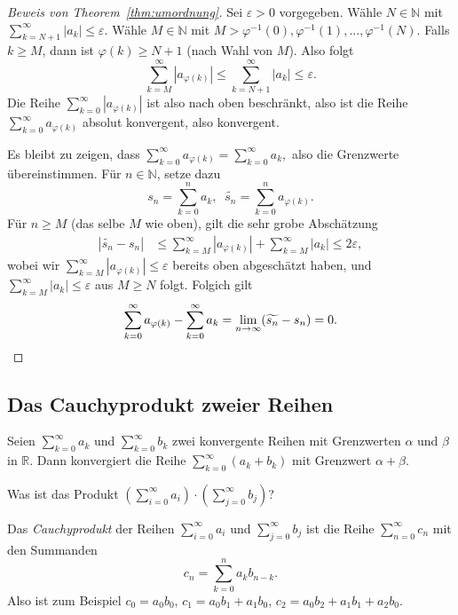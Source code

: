 \documentclass[../main.tex]{subfiles}
\begin{document}
\begin{proof}[Beweis von Theorem~\ref{thm:umordnung}]
  Sei $\varepsilon > 0$ 
  vorgegeben.
  Wähle $N \in \mathbb{N}$ 
  mit $\sum_{k=N+1}^{\infty} |a_k| \leq \varepsilon$.
  Wähle $M \in \mathbb{N}$ mit $M > \varphi^{-1}(0),
  \varphi^{-1}(1), \dots, \varphi^{-1}(N)$.
  Falls $k \geq M$, dann ist $\varphi(k) \geq N+1$
  (nach Wahl von $M$).
  Also folgt
  \[
   \sum_{k=M}^{\infty} |a_{\varphi(k)}| 
   \leq \sum_{k=N+1}^{\infty} |a_k| \leq \varepsilon.
  \]
  Die Reihe
  $\sum_{k=0}^{\infty} |a_{\varphi(k)}|$ ist also
  nach oben beschränkt,
  also ist die Reihe
  $\sum_{k=0}^{\infty} a_{\varphi(k)}$ absolut konvergent,
  also konvergent.

  Es bleibt zu zeigen, dass
  \(
    \sum_{k=0}^{\infty} a_{\varphi(k)} = \sum_{k=0}^{\infty} a_k,
  \)
  also die Grenzwerte übereinstimmen.
  Für $n \in \mathbb{N}$, setze dazu
  \[
    s_n = \sum_{k=0}^{n} a_k, \;\; \widetilde{s_n} =
    \sum_{k=0}^{n} a_{\varphi(k)}.
  \]
  Für $n \geq M$ (das selbe $M$ wie oben),
  gilt die sehr grobe Abschätzung
  \begin{align*}
    |\widetilde{s_n} - s_n| & \leq
    \sum_{k=M}^{\infty} |a_{\varphi(k)}|
    + \sum_{k=M}^{\infty} |a_k| \leq 2\varepsilon,
  \end{align*}
  wobei wir
  $\sum_{k=M}^{\infty} |a_{\varphi(k)}| \leq \varepsilon$ 
  bereits oben abgeschätzt haben,
  und $\sum_{k=M}^{\infty} |a_k| \leq \varepsilon$ aus
  $M \geq N$ folgt.
  Folgich gilt
  \[
    \sum_{k=0}^{\infty} a_{\varphi(k)}
    - \sum_{k=0}^{\infty} a_{k} =
    \lim_{n \to \infty}(\widetilde{s_n} - s_n) = 0. \qedhere
  \]
\end{proof}

\subsection*{Das Cauchyprodukt zweier Reihen}
Seien $\sum_{k=0}^{\infty} a_k$ und $\sum_{k=0}^{\infty} b_k$ 
zwei konvergente Reihen mit Grenzwerten
$\alpha$ und $\beta$ in $\mathbb{R}$.
Dann konvergiert die Reihe
$\sum_{k=0}^{\infty} (a_k + b_k)$ mit Grenzwert
$\alpha + \beta$.

\begin{question}
  Was ist das Produkt $\left( \sum_{i=0}^{\infty} a_i \right)
  \cdot \left( \sum_{j=0}^{\infty} b_j \right)$?
\end{question}

\begin{definition}
  Das \emph{Cauchyprodukt} der Reihen
  $\sum_{i=0}^{\infty} a_i$ und $\sum_{j=0}^{\infty} b_j$ 
  ist die Reihe $\sum_{n=0}^{\infty} c_n$ mit den Summanden
  \[
    c_n = \sum_{k=0}^{n} a_k b_{n-k}.
  \]
  Also ist zum Beispiel
    $c_0 = a_0 b_0$,
    $c_1 = a_0 b_1 + a_1 b_0$,
    $c_2 = a_0 b_2 + a_1 b_1 + a_2 b_0$.
\end{definition}
\end{document}
